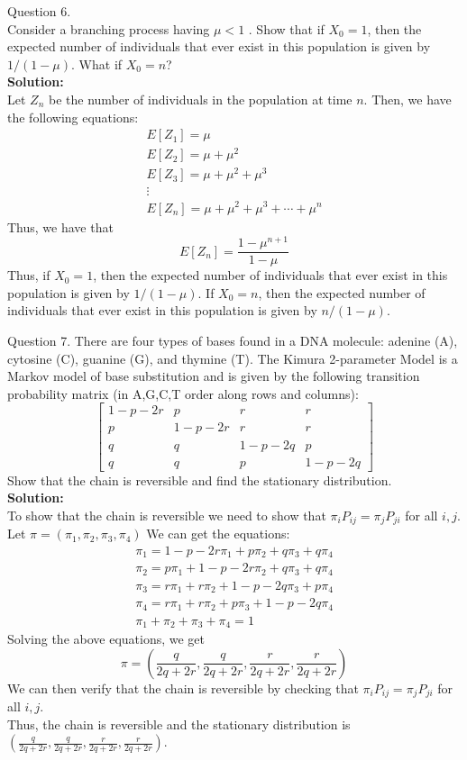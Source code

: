 \documentclass[answers,12pt,addpoints]{exam}
\begin{document}
\begin{questions}
\question Question 6.\\
Consider a branching process having $\mu < 1$ . Show that if $X_0 = 1$, then the expected number of individuals that ever exist in this population is given by $1/(1-\mu)$. What if $X_0 = n$?\\
\textbf{Solution:}\\
Let $Z_n$ be the number of individuals in the population at time $n$. Then, we have the following equations:
\begin{align*}
    E[Z_1] = \mu\\
    E[Z_2] = \mu + \mu^2\\
    E[Z_3] = \mu + \mu^2 + \mu^3\\
    \vdots\\
    E[Z_n] = \mu + \mu^2 + \mu^3 + \cdots + \mu^n
\end{align*}
Thus, we have that
$$E[Z_n] = \frac{1-\mu^{n+1}}{1-\mu}$$
Thus, if $X_0 = 1$, then the expected number of individuals that ever exist in this population is given by $1/(1-\mu)$. If $X_0 = n$, then the expected number of individuals that ever exist in this population is given by $n/(1-\mu)$.

\question Question 7.
There are four types of bases found in a DNA molecule: adenine (A), cytosine (C),
guanine (G), and thymine (T). The Kimura 2-parameter Model is a Markov model of
base substitution and is given by the following transition probability matrix
(in A,G,C,T order along rows and columns):
$$ \begin{bmatrix}
    1-p -2r & p & r & r\\
    p & 1-p -2r & r & r\\
    q & q & 1-p -2q & p\\
    q & q & p & 1-p -2q
\end{bmatrix} $$
Show that the chain is reversible and find the stationary distribution.\\
\textbf{Solution:}\\
To show that the chain is reversible we need to show that $\pi_iP_{ij} = \pi_jP_{ji}$ for all $i,j$. Let $\pi = (\pi_1, \pi_2, \pi_3, \pi_4)$ We can get the equations:
\begin{align*}
    \pi_1 = 1-p-2r\pi_1 + p\pi_2 + q\pi_3 + q\pi_4\\
    \pi_2 = p\pi_1 + 1-p-2r\pi_2 + q\pi_3 + q\pi_4\\
    \pi_3 = r\pi_1 + r\pi_2 + 1-p-2q\pi_3 + p\pi_4\\
    \pi_4 = r\pi_1 + r\pi_2 + p\pi_3 + 1-p-2q\pi_4\\
    \pi_1 + \pi_2 + \pi_3 + \pi_4 = 1
\end{align*}
Solving the above equations, we get
$$\pi = \left(\frac{q}{2q+2r}, \frac{q}{2q+2r}, \frac{r}{2q+2r}, \frac{r}{2q+2r}\right)$$
We can then verify that the chain is reversible by checking that $\pi_iP_{ij} = \pi_jP_{ji}$ for all $i,j$. \\
Thus, the chain is reversible and the stationary distribution is $\left(\frac{q}{2q+2r}, \frac{q}{2q+2r}, \frac{r}{2q+2r}, \frac{r}{2q+2r}\right)$.




\end{questions}
\end{document}
